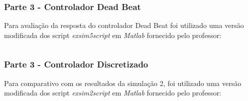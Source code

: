 \documentclass[a4paper,11pt]{article}
\begin{document}
\inputminted[xleftmargin=15pt,linenos,frame=single,framesep=5pt,breaklines=true]{matlab}{../matlab/exsim5/exsim5.m}

\subsubsection*{Parte 3 - Controlador Dead Beat}
Para avaliação da resposta do controlador Dead Beat foi utilizado uma versão modificada dos script \textit{exsim5script} em \textit{Matlab} fornecido pelo professor:
\inputminted[xleftmargin=15pt,linenos,frame=single,framesep=5pt,breaklines=true]{matlab}{../matlab/exsim5/exsim5script.m}

\subsubsection*{Parte 3 - Controlador Discretizado}
Para comparativo com os resultados da simulação 2, foi utilizado uma versão modificada dos script \textit{exsim2script} em \textit{Matlab} fornecido pelo professor:
\inputminted[xleftmargin=15pt,linenos,frame=single,framesep=5pt,breaklines=true]{matlab}{../matlab/exsim5/exsim2script.m}



\end{document}
